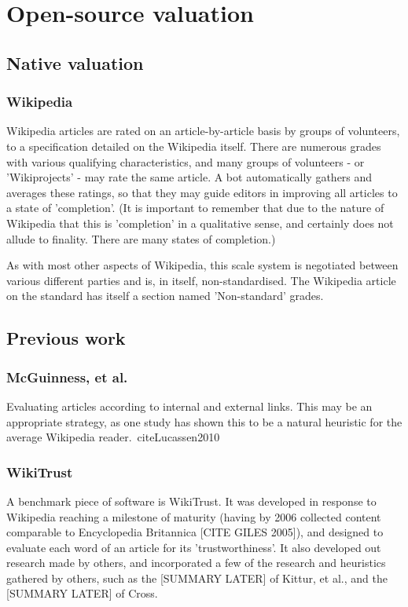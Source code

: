 \documentclass[a4paper,11pt,twoside,notitlepage]{report}
\begin{document}
        \section{Open-source valuation}
        \subsection{Native valuation}
        \subsubsection{Wikipedia}
        Wikipedia articles are rated on an article-by-article basis by
        groups of volunteers, to a specification detailed on the
        Wikipedia itself. There are numerous grades with various
        qualifying characteristics, and many groups of volunteers - or
        'Wikiprojects' - may rate the same article. A bot
        automatically gathers and averages these ratings, so that they
        may guide editors in improving all articles to a state of
        'completion'. (It is important to remember that due to the
        nature of Wikipedia that this is 'completion' in a qualitative
        sense, and certainly does not allude to finality. There are
        many states of completion.)

        As with most other aspects of Wikipedia, this scale system is
        negotiated between various different parties and is, in
        itself, non-standardised. The Wikipedia article on the
        standard has itself a section named 'Non-standard' grades.

        \subsection{Previous work}
        \subsubsection{McGuinness, et al.}
        Evaluating articles according to internal and external
        links. This may be an appropriate strategy, as one study has
        shown this to be a natural heuristic for the average Wikipedia
        reader.~cite{Lucassen2010}

        \subsubsection{WikiTrust}
        A benchmark piece of software is WikiTrust. It was developed
        in response to Wikipedia reaching a milestone of maturity
        (having by 2006 collected content comparable to Encyclopedia
        Britannica [CITE GILES 2005]), and designed to evaluate each
        word of an article for its 'trustworthiness'. It also
        developed out research made by others, and incorporated a few of
        the research and heuristics gathered by others, such as the
        [SUMMARY LATER] of Kittur, et al., and the [SUMMARY LATER] of
        Cross. 
\end{document}
